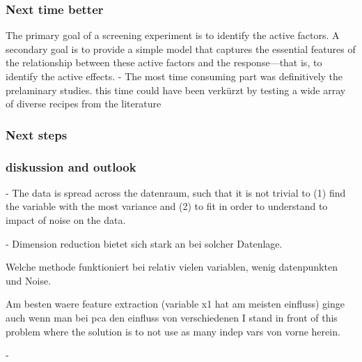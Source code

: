 \subsubsection{Next time better}
{The primary goal of a screening experiment is to identify the active factors.
A secondary goal is to provide a simple model that captures the essential features of the 
relationship between these active factors and the response—that is, to identify the active effects. \cite{miller2001using}}
%
%
- The most time consuming part was definitively the prelaminary studies.
this time could have been verkürzt by testing a wide array of diverse recipes from the literature
\subsubsection{Next steps}


\subsubsection{diskussion and outlook}


- The data is spread across the datenraum, such that it is not trivial to 
(1) find the variable with the most variance and 
(2) to fit in order to understand to impact of noise on the data. 

- Dimension reduction bietet sich stark an bei solcher Datenlage. 

Welche methode funktioniert bei relativ vielen variablen, wenig datenpunkten und Noise. 

Am besten waere feature extraction (variable x1 hat am meisten einfluss) 
ginge auch wenn man bei pca den einfluss von verschiedenen 
I stand in front of this problem where the solution is to not use as many indep vars von vorne herein. 

-

